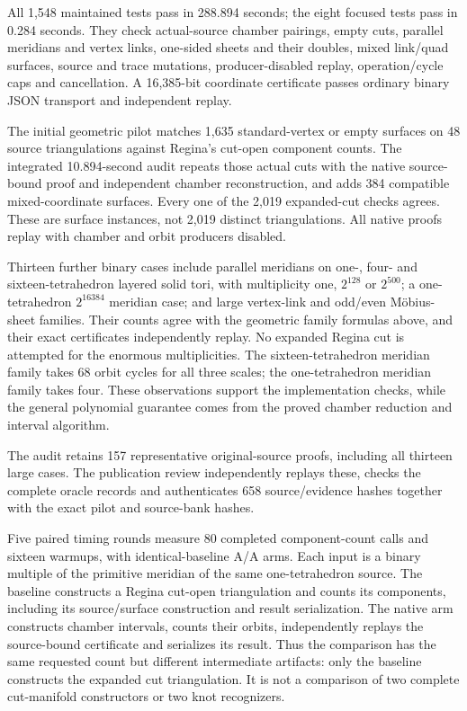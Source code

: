 All 1,548 maintained tests pass in 288.894 seconds; the eight focused tests
pass in 0.284 seconds. They check actual-source chamber pairings, empty cuts,
parallel meridians and vertex links, one-sided sheets and their doubles,
mixed link/quad surfaces, source and trace mutations, producer-disabled
replay, operation/cycle caps and cancellation. A 16,385-bit coordinate
certificate passes ordinary binary JSON transport and independent replay.

The initial geometric pilot matches 1,635 standard-vertex or empty surfaces
on 48 source triangulations against Regina's cut-open component counts.
The integrated 10.894-second audit repeats those actual cuts with the native
source-bound proof and independent chamber reconstruction, and adds 384
compatible mixed-coordinate surfaces. Every one of the 2,019 expanded-cut
checks agrees. These are surface instances, not 2,019 distinct triangulations.
All native proofs replay with chamber and orbit producers disabled.

Thirteen further binary cases include parallel meridians on one-, four- and
sixteen-tetrahedron layered solid tori, with multiplicity one, $2^{128}$ or
$2^{500}$; a one-tetrahedron $2^{16384}$ meridian case; and large vertex-link
and odd/even M\"obius-sheet families. Their counts agree with the geometric
family formulas above, and their exact certificates independently replay.
No expanded Regina cut is attempted for the enormous multiplicities.
The sixteen-tetrahedron meridian family takes 68 orbit cycles for all three
scales; the one-tetrahedron meridian family takes four. These observations
support the implementation checks, while the general polynomial guarantee
comes from the proved chamber reduction and interval algorithm.

The audit retains 157 representative original-source proofs, including all
thirteen large cases. The publication review independently replays these,
checks the complete oracle records and authenticates 658 source/evidence
hashes together with the exact pilot and source-bank hashes.

Five paired timing rounds measure 80 completed component-count calls and
sixteen warmups, with identical-baseline A/A arms. Each input is a binary
multiple of the primitive meridian of the same one-tetrahedron source.
The baseline constructs a Regina cut-open triangulation and counts its
components, including its source/surface construction and result serialization.
The native arm constructs chamber intervals, counts their orbits, independently
replays the source-bound certificate and serializes its result. Thus the
comparison has the same requested count but different intermediate artifacts:
only the baseline constructs the expanded cut triangulation. It is not a
comparison of two complete cut-manifold constructors or two knot recognizers.


